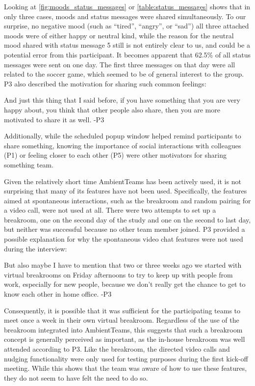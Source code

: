 Looking at \autoref{fig:moods_status_messages} or \autoref{table:status_messages} shows that in only three cases, moods and status messages were shared simultaneously. To our surprise, no negative mood (such as \enquote{tired}, \enquote{angry}, or \enquote{sad}) all three attached moods were of either happy or neutral kind, while the reason for the neutral mood shared with status message 5 still is not entirely clear to us, and could be a potential error from this participant. It becomes apparent that 62.5\% of all status messages were sent on one day. The first three messages on that day were all related to the soccer game, which seemed to be of general interest to the group. P3 also described the motivation for sharing such common feelings:

\begin{displayquote}
    And just this thing that I said before, if you have something that you are very happy about, you think that other people also share, then you are more motivated to share it as well. -P3
\end{displayquote}

Additionally, while the scheduled popup window helped remind participants to share something, knowing the importance of social interactions with colleagues (P1) or feeling closer to each other (P5) were other motivators for sharing something team.

Given the relatively short time AmbientTeams has been actively used, it is not surprising that many of its features have not been used. Specifically, the features aimed at spontaneous interactions, such as the breakroom and random pairing for a video call, were not used at all. There were two attempts to set up a breakroom, one on the second day of the study and one on the second to last day, but neither was successful because no other team member joined. P3 provided a possible explanation for why the spontaneous video chat features were not used during the interview:

\begin{displayquote}
    But also maybe I have to mention that two or three weeks ago we started with virtual breakrooms on Friday afternoons to try to keep up with people from work, especially for new people, because we don't really get the chance to get to know each other in home office. -P3
\end{displayquote}

Consequently, it is possible that it was sufficient for the participating teams to meet once a week in their own virtual breakroom. Regardless of the use of the breakroom integrated into AmbientTeams, this suggests that such a breakroom concept is generally perceived as important, as the in-house breakroom was well attended according to P3. Like the breakroom, the directed video calls and nudging functionality were only used for testing purposes during the first kick-off meeting. While this shows that the team was aware of how to use these features, they do not seem to have felt the need to do so.

